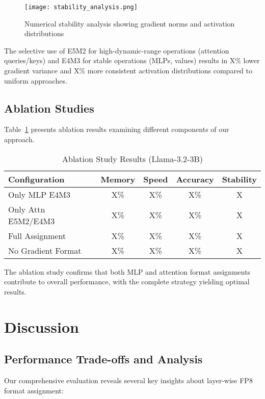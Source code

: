 \documentclass[conference]{IEEEtran}
\begin{document}
\begin{figure}[htbp]
    \centering
    \texttt{[image: stability\_analysis.png]}
    \caption{Numerical stability analysis showing gradient norms and activation distributions}
    \label{fig:stability_analysis}
\end{figure}

The selective use of E5M2 for high-dynamic-range operations (attention queries/keys) and E4M3 for stable operations (MLPs, values) results in X\% lower gradient variance and X\% more consistent activation distributions compared to uniform approaches.

\subsection{Ablation Studies}

Table~\ref{tab:ablation} presents ablation results examining different components of our approach.

\begin{table}[htbp]
\centering
\caption{Ablation Study Results (Llama-3.2-3B)}
\begin{tabular}{@{}lcccc@{}}
\toprule
\textbf{Configuration} & \textbf{Memory} & \textbf{Speed} & \textbf{Accuracy} & \textbf{Stability} \\
\midrule
Only MLP E4M3 & X\% & X\% & X\% & X \\
Only Attn E5M2/E4M3 & X\% & X\% & X\% & X \\
Full Assignment & X\% & X\% & X\% & X \\
No Gradient Format & X\% & X\% & X\% & X \\
\bottomrule
\end{tabular}
\label{tab:ablation}
\end{table}

The ablation study confirms that both MLP and attention format assignments contribute to overall performance, with the complete strategy yielding optimal results.

\section{Discussion}

\subsection{Performance Trade-offs and Analysis}

Our comprehensive evaluation reveals several key insights about layer-wise FP8 format assignment:
\end{document}
